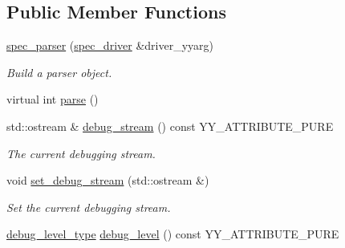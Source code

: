 \subsection*{Public Member Functions}
\begin{DoxyCompactItemize}
\item 
\hyperlink{classyy_1_1spec__parser_a61524c00b363113cfabcfe57ec3c9f4b}{spec\+\_\+parser} (\hyperlink{classspec__driver}{spec\+\_\+driver} \&driver\+\_\+yyarg)\hypertarget{classyy_1_1spec__parser_a61524c00b363113cfabcfe57ec3c9f4b}{}\label{classyy_1_1spec__parser_a61524c00b363113cfabcfe57ec3c9f4b}

\begin{DoxyCompactList}\small\item\em Build a parser object. \end{DoxyCompactList}\item 
virtual int \hyperlink{classyy_1_1spec__parser_afc65ed84818228c2d3e0988d48f00fa7}{parse} ()
\item 
std\+::ostream \& \hyperlink{classyy_1_1spec__parser_a2dff93d2a24ecdb6e81e8416fd364b04}{debug\+\_\+stream} () const Y\+Y\+\_\+\+A\+T\+T\+R\+I\+B\+U\+T\+E\+\_\+\+P\+U\+RE\hypertarget{classyy_1_1spec__parser_a2dff93d2a24ecdb6e81e8416fd364b04}{}\label{classyy_1_1spec__parser_a2dff93d2a24ecdb6e81e8416fd364b04}

\begin{DoxyCompactList}\small\item\em The current debugging stream. \end{DoxyCompactList}\item 
void \hyperlink{classyy_1_1spec__parser_a2309416ea3d3218f4c217f3e3fbf13df}{set\+\_\+debug\+\_\+stream} (std\+::ostream \&)\hypertarget{classyy_1_1spec__parser_a2309416ea3d3218f4c217f3e3fbf13df}{}\label{classyy_1_1spec__parser_a2309416ea3d3218f4c217f3e3fbf13df}

\begin{DoxyCompactList}\small\item\em Set the current debugging stream. \end{DoxyCompactList}\item 
\hyperlink{classyy_1_1spec__parser_a72ba7ab2d17656353c1bf34e56d6f418}{debug\+\_\+level\+\_\+type} \hyperlink{classyy_1_1spec__parser_ad90833ef063d95b5fccdd12017f5b9f6}{debug\+\_\+level} () const Y\+Y\+\_\+\+A\+T\+T\+R\+I\+B\+U\+T\+E\+\_\+\+P\+U\+RE\hypertarget{classyy_1_1spec__parser_ad90833ef063d95b5fccdd12017f5b9f6}{}\label{classyy_1_1spec__parser_ad90833ef063d95b5fccdd12017f5b9f6}


\end{DoxyCompactItemize}
